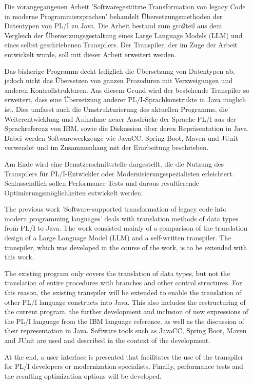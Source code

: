 Die vorangegangenen Arbeit 'Softwaregestützte Transformation von legacy Code in moderne Programmiersprachen' behandelt Übersetzungsmethoden der Datentypen von PL/I zu Java. Die Arbeit bestand zum großteil aus dem Vergleich der Übersetzungsgestaltung eines Large Language Models (LLM) und eines selbst geschriebenen Transpilers. Der Transpiler, der im Zuge der Arbeit entwickelt wurde, soll mit dieser Arbeit erweitert werden.



Das bisherige Programm deckt lediglich die Übersetzung von Datentypen ab, jedoch nicht das Übersetzen von ganzen Prozeduren mit Verzweigungen und anderen Kontrollstrukturen. Aus diesem Grund wird der bestehende Transpiler so erweitert, dass eine Übersetzung anderer PL/I-Sprachkonstrukte in Java möglich ist. Dies umfasst auch die Umstrukturierung des aktuellen Programms, die Weiterentwicklung und Aufnahme neuer Ausdrücke der Sprache PL/I aus der Sprachreferenz von IBM, sowie die Diskussion über deren Repräsentation in Java. Dabei werden Softwarewerkzeuge wie JavaCC, Spring Boot, Maven und JUnit verwendet und im Zusammenhang mit der Erarbeitung beschrieben. 

Am Ende wird eine Benutzerschnittstelle dargestellt, die die Nutzung des Transpilers für PL/I-Entwickler oder Modernisierungsspezialisten erleichtert. Schlussendlich sollen Performance-Tests und daraus resultierende Optimierungsmöglichkeiten entwickelt werden.

The previous work 'Software-supported transformation of legacy code into modern programming languages' deals with translation methods of data types from PL/I to Java. The work consisted mainly of a comparison of the translation design of a Large Language Model (LLM) and a self-written transpiler. The transpiler, which was developed in the course of the work, is to be extended with this work.

The existing program only covers the translation of data types, but not the translation of entire procedures with branches and other control structures. For this reason, the existing transpiler will be extended to enable the translation of other PL/I language constructs into Java. This also includes the restructuring of the current program, the further development and inclusion of new expressions of the PL/I language from the IBM language reference, as well as the discussion of their representation in Java. Software tools such as JavaCC, Spring Boot, Maven and JUnit are used and described in the context of the development. 

At the end, a user interface is presented that facilitates the use of the transpiler for PL/I developers or modernization specialists. Finally, performance tests and the resulting optimization options will be developed.



